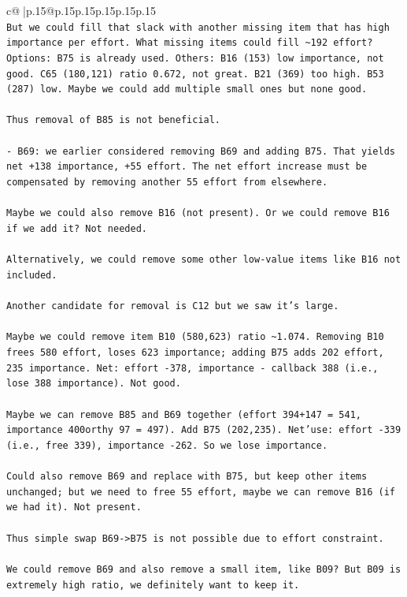 \documentclass{article}
\begin{document}
{\begin{supertabular}{c@{$\;$}|p{.15\linewidth}@{}p{.15\linewidth}p{.15\linewidth}p{.15\linewidth}p{.15\linewidth}p{.15\linewidth}}
{{{\\ 
\texttt{But we could fill that slack with another missing item that has high importance per effort. What missing items could fill \textasciitilde{}192 effort? Options: B75 is already used. Others: B16 (153) low importance, not good. C65 (180,121) ratio 0.672, not great. B21 (369) too high. B53 (287) low. Maybe we could add multiple small ones but none good.} \\
\\ 
\texttt{Thus removal of B85 is not beneficial.} \\
\\ 
\texttt{{-} B69: we earlier considered removing B69 and adding B75. That yields net +138 importance, +55 effort. The net effort increase must be compensated by removing another 55 effort from elsewhere.} \\
\\ 
\texttt{Maybe we could also remove B16 (not present). Or we could remove B16 if we add it? Not needed.} \\
\\ 
\texttt{Alternatively, we could remove some other low{-}value items like B16 not included.} \\
\\ 
\texttt{Another candidate for removal is C12 but we saw it's large.} \\
\\ 
\texttt{Maybe we could remove item B10 (580,623) ratio \textasciitilde{}1.074. Removing B10 frees 580 effort, loses 623 importance; adding B75 adds 202 effort, 235 importance. Net: effort {-}378, importance {-} callback 388 (i.e., lose 388 importance). Not good.} \\
\\ 
\texttt{Maybe we can remove B85 and B69 together (effort 394+147 = 541, importance 400orthy 97 = 497). Add B75 (202,235). Net'use: effort {-}339 (i.e., free 339), importance {-}262. So we lose importance.} \\
\\ 
\texttt{Could also remove B69 and replace with B75, but keep other items unchanged; but we need to free 55 effort, maybe we can remove B16 (if we had it). Not present.} \\
\\ 
\texttt{Thus simple swap B69{-}>B75 is not possible due to effort constraint.} \\
\\ 
\texttt{We could remove B69 and also remove a small item, like B09? But B09 is extremely high ratio, we definitely want to keep it.} \\
}}}
\end{supertabular}}
\end{document}
